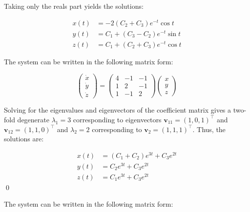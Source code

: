 \documentclass[12pt]{article}
\begin{document}
Taking only the reals part yields the solutions:

\begin{equation}
    \begin{split}
        x(t) &= -2 (C_{2} + C_{3}) e^{-t} \cos{t} \\
        y(t) &= C_{1} + (C_{3} - C_{2}) e^{-t} \sin{t} \\
        z(t) &= C_{1} + (C_{2} + C_{3}) e^{-t} \cos{t}
    \end{split}
\end{equation}

The system can be written in the following matrix form:

\begin{equation}
    \begin{pmatrix}
        \dot{x} \\
        \dot{y} \\
        \dot{z}
    \end{pmatrix}
    =
    \begin{pmatrix}
        4 & -1 & -1 \\
        1 & 2  & -1 \\
        1 & -1 & 2
    \end{pmatrix}
    \begin{pmatrix}
        x \\
        y \\
        z
    \end{pmatrix}
\end{equation}

Solving for the eigenvalues and eigenvectors of the coefficient matrix gives a two-fold degenerate $\lambda_{1} = 3$ corresponding to eigenvectors $\mathbf{v}_{11} = (1, 0, 1)^{\intercal}$ and $\mathbf{v}_{12} = (1, 1, 0)^{\intercal}$ and $\lambda_{2} = 2$ corresponding to $\mathbf{v}_{2} = (1, 1, 1)^{\intercal}$. Thus, the solutions are:

\begin{equation}
    \begin{split}
        x(t) &= (C_{1} + C_{2}) e^{3t} + C_{3} e^{2t} \\
        y(t) &= C_{2} e^{3t} + C_{3} e^{2t} \\
        z(t) &= C_{1} e^{3t} + C_{3} e^{2t}
    \end{split}
\end{equation}
\qed



The system can be written in the following matrix form:
\end{document}
